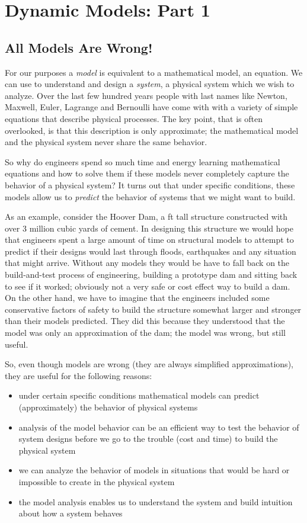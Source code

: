 \chapter{Dynamic Models: Part 1}\label{c:model1}

\section{All Models Are Wrong!}
For our purposes a \emph{model} is equivalent to a \gls{mathematical model}, an equation.  We can use to understand and design a \emph{system}, a physical system which we wish to analyze.  Over the last few hundred years people with last names like Newton, Maxwell, Euler, Lagrange  and Bernoulli have come with with a variety of simple equations that describe physical processes.  The key point, that is often overlooked, is that this description is only approximate; the mathematical model and the physical system never share the same behavior.

So why do engineers spend so much time and energy learning mathematical equations and how to solve them if these models never completely capture the behavior of a physical system?  It turns out that under specific conditions, these models allow us to \emph{predict} the behavior of systems that we might want to build.  

As an example, consider the Hoover Dam, a \unit[726]{ft} tall structure constructed with over 3 million cubic yards of cement.  In designing this structure we would hope that engineers spent a large amount of time on structural models to attempt to predict if their designs would last through floods, earthquakes and any situation that might arrive.  Without any models they would be have to fall back on the build-and-test process of engineering, building a prototype dam and sitting back to see if it worked; obviously not a very safe or cost effect way to build a dam.  On the other hand, we have to imagine that the engineers included some conservative factors of safety to build the structure somewhat larger and stronger than their models predicted.  They did this because they understood that the model was only an approximation of the dam; the model was wrong, but still useful.  

So, even though models are wrong (they are always simplified approximations), they are useful for the following reasons:
\begin{itemize}
\item under certain specific conditions mathematical models can predict (approximately) the behavior of physical systems
\item analysis of the model behavior can be an efficient way to test the behavior of system designs before we go to the trouble (cost and time) to build the physical system
\item we can analyze the behavior of models in situations that would be hard or impossible to create in the physical system
\item the model analysis enables us to understand the system and build intuition about how a system behaves 
\end{itemize}

